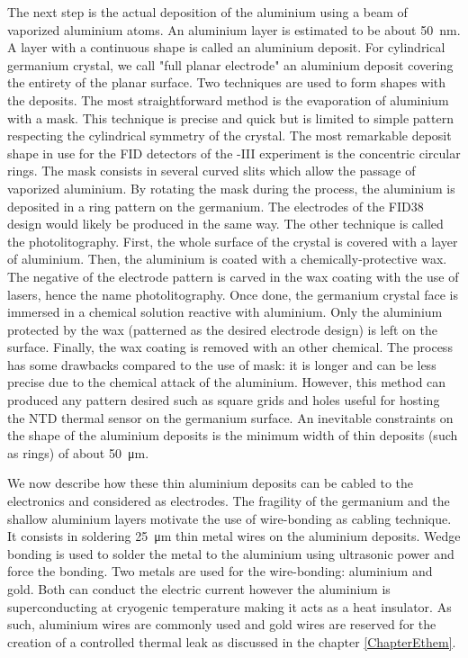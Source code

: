 The next step is the actual deposition of the aluminium using a beam of vaporized aluminium atoms. An aluminium layer is estimated to be about \SI{50}{\nano\m}. A layer with a continuous shape is called an aluminium deposit. For cylindrical germanium crystal, we call "full planar electrode" an aluminium deposit covering the entirety of the planar surface.
Two techniques are used to form shapes with the deposits.
The most straightforward method is the evaporation of aluminium with a mask. This technique is precise and quick but is limited to simple pattern respecting the cylindrical symmetry of the crystal. The most remarkable deposit shape in use for the FID detectors of the \Edelweiss{}-III experiment is the concentric circular rings. The mask  consists in several curved slits which allow the passage of vaporized aluminium. By rotating the mask during the process, the aluminium is deposited in a ring pattern on the germanium. The electrodes of the FID38 design would likely be produced in the same way.
The other technique is called the photolitography. First, the whole surface of the crystal is covered with a layer of aluminium. Then, the aluminium is coated with a chemically-protective wax. The negative of the electrode pattern is carved in the wax coating with the use of lasers, hence the name photolitography. Once done, the germanium crystal face is immersed in a chemical solution reactive with aluminium. Only the aluminium protected by the wax (patterned as the desired electrode design) is left on the surface. Finally, the wax coating is removed with an other chemical. The process has some drawbacks compared to the use of mask: it is longer and can be less precise due to the chemical attack of the aluminium. However, this method can produced any pattern desired such as  square grids and holes useful for hosting the NTD thermal sensor on the germanium surface.
An inevitable constraints on the shape of the aluminium deposits is the minimum width of thin deposits (such as rings) of about \SI{50}{\micro\m}.

We now describe how these thin aluminium deposits can be cabled to the electronics and considered as electrodes.
The fragility of the germanium and the shallow aluminium layers motivate the use of wire-bonding as cabling technique. It consists in soldering \SI{25}{\micro\meter} thin metal wires on the aluminium deposits. Wedge bonding is used to solder the metal to the aluminium using ultrasonic power and force the bonding. Two metals are used for the wire-bonding: aluminium and gold. Both can conduct the electric current however the aluminium is superconducting at cryogenic temperature making it acts as a heat insulator. As such, aluminium wires are commonly used and gold wires are reserved for the creation of a controlled thermal leak as discussed in the chapter \ref{ChapterEthem}.

